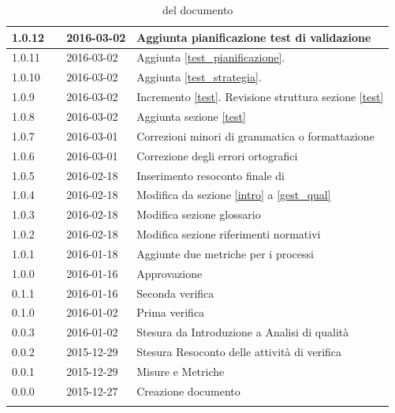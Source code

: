 \documentclass[12pt,a4paper]{article}
\begin{document}
\begin{center}
\begin{longtable}[H]{p{} p{} p{} p{}}
			1.0.12 & \AB & 2016-03-02 & Aggiunta pianificazione test di validazione\\*
			\midrule
			1.0.11 & \AB & 2016-03-02 & Aggiunta \ref{test_pianificazione}.\\*
			\midrule
			1.0.10 & \AB & 2016-03-02 & Aggiunta \ref{test_strategia}.\\*
			\midrule
			1.0.9 & \AB & 2016-03-02 & Incremento \ref{test}. Revisione struttura sezione \ref{test} \\*
			\midrule
			1.0.8 & \AB & 2016-03-02 & Aggiunta sezione \ref{test} \\*
			\midrule
			1.0.7 & \AB{} & 2016-03-01 & Correzioni minori di grammatica o formattazione \\*
			\midrule
			1.0.6 & \AB{} & 2016-03-01 & Correzione degli errori ortografici   \\*
			\midrule
			1.0.5 & \AB & 2016-02-18 &  Inserimento resoconto finale di \FAD \\*
			\midrule
			1.0.4 & \AB{} & 2016-02-18 & Modifica da  sezione \ref{intro} a \ref{gest_qual} \\*
			\midrule
			1.0.3 & \AB{} & 2016-02-18 & Modifica sezione glossario  \\*
			\midrule
			1.0.2 & \AB{} & 2016-02-18 & Modifica sezione riferimenti normativi \\*
			\midrule
			1.0.1 & \AB{} & 2016-01-18 & Aggiunte due metriche per i processi \\*
			\midrule
			1.0.0 & \IB{} & 2016-01-16 & Approvazione \\*
			\midrule
			0.1.1 & \AVE{} & 2016-01-16 & Seconda verifica \\*
			\midrule
			0.1.0 & \NDC{} & 2016-01-02 & Prima verifica \\*
			\midrule
			0.0.3 & \AB{} & 2016-01-02 &  Stesura da Introduzione a Analisi di qualità\\*
			\midrule
			0.0.2 & \WS{} & 2015-12-29 &  Stesura Resoconto delle attività di verifica\\*
			\midrule
			0.0.1 & \AVI{} & 2015-12-29 &  Misure e Metriche \\*
			\midrule
			0.0.0 & \IB{} & 2015-12-27 &  Creazione documento \\*
			\bottomrule
			\caption{\mGls{versionamento}  del documento}
			\label{tabVers1}
		\end{longtable}
	\end{center}
	
	\newpage
	\tableofcontents
	\newpage
	\listoftables
	\listoffigures
	\newpage
	
\end{document}
